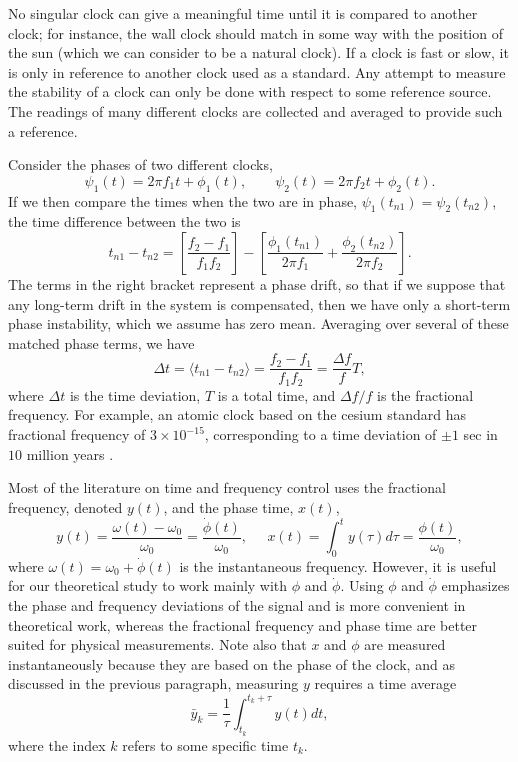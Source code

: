 No singular clock can give a meaningful time until it is compared to another clock; for instance, the wall clock should match in some way with the position of the sun (which we can consider to be a natural clock). If a clock is fast or slow, it is only in reference to another clock used as a standard. Any attempt to measure the stability of a clock can only be done with respect to some reference source. The readings of many different clocks are collected and averaged to provide such a reference. 

Consider the phases of two different clocks,
%
\begin{equation}
\psi_1(t) = 2\pi f_1t + \phi_1(t), \qquad \psi_2(t) = 2\pi f_2t + \phi_2(t).
\end{equation}
%
If we then compare the times when the two are in phase, $\psi_1(t_{n1}) = \psi_2(t_{n2})$, the time difference between the two is
%
\begin{equation}
t_{n1} - t_{n2} = \left[\frac{f_2 - f_1}{f_1f_2}\right] - \left[\frac{\phi_1(t_{n1})}{2\pi f_1} + \frac{\phi_2(t_{n2})}{2\pi f_2}\right].
\end{equation}
%
The terms in the right bracket represent a phase drift, so that if we suppose that any long-term drift in the system is compensated, then we have only a short-term phase instability, which we assume has zero mean. Averaging over several of these matched phase terms, we have
%
\begin{equation}
\Delta t = \langle t_{n1} - t_{n2} \rangle = \frac{f_2 - f_1}{f_1f_2} = \frac{\Delta f}{f}T,
\end{equation}
%
where $\Delta t$ is the time deviation, $T$ is a total time, and $\Delta f/f$ is the fractional frequency. For example, an atomic clock based on the cesium standard has fractional frequency of $3 \times 10^{-15}$, corresponding to a time deviation of $\pm 1$ sec in $10$ million years \cite{CsFracFreq}.

Most of the literature on time and frequency control uses the fractional frequency, denoted $y(t)$, and the phase time, $x(t)$, \cite{Kartaschoff1978, Allan1974, Riley1994}
%
\begin{equation}
\label{eq:phasefreqquantities}
y(t) = \frac{\omega(t) - \omega_0}{\omega_0} = \frac{\dot{\phi}(t)}{\omega_0}, \;\;\;\;\; x(t) = \int_0^t y(\tau)d\tau = \frac{\phi(t)}{\omega_0},
\end{equation}
%
where $\omega(t) = \omega_0 + \dot{\phi}(t)$ is the instantaneous frequency. However, it is useful for our theoretical study to work mainly with $\phi$ and $\dot{\phi}$. Using $\phi$ and $\dot{\phi}$ emphasizes the phase and frequency deviations of the signal and is more convenient in theoretical work, whereas the fractional frequency and phase time are better suited for physical measurements. Note also that $x$ and $\phi$ are measured instantaneously because they are based on the phase of the clock, and as discussed in the previous paragraph, measuring $y$ requires a time average
%
\begin{equation} \label{eq:avgy}
\bar{y}_k = \frac{1}{\tau}\int_{t_k}^{t_k+\tau} y(t)dt,
\end{equation}
%
where the index $k$ refers to some specific time $t_k$.

